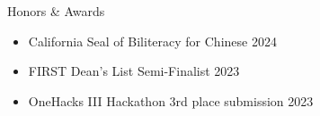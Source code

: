 \documentclass[
	10pt, %
]{tex/resume} %
\begin{document}

\begin{rSection}{Honors \& Awards}

    \begin{itemize}
        \setlength\itemsep{-0.7em} %
        \item California Seal of Biliteracy for Chinese \hfill 2024
        \item FIRST Dean's List Semi-Finalist \hfill 2023
        \item OneHacks III Hackathon 3rd place submission \hfill 2023


    \end{itemize}

\end{rSection}





\end{document}
